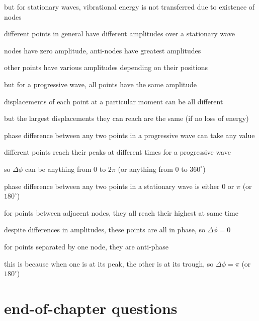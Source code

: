 but for stationary waves, vibrational energy is not transferred due to existence of nodes

\cmt different points in general have different amplitudes over a stationary wave

\hspace*{1.25em} nodes have zero amplitude, anti-nodes have greatest amplitudes

\hspace*{1.25em} other points have various amplitudes depending on their positions

but for a progressive wave, all points have the same amplitude

\hspace*{1.25em} displacements of each point at a particular moment can be all different

\hspace*{1.25em} but the largest displacements they can reach are the same (if no loss of energy)

\cmt phase difference between any two points in a progressive wave can take any value

\hspace*{1.25em} different points reach their peaks at different times for a progressive wave

\hspace*{1.25em} so $\Delta \phi$ can be anything from 0 to $2\pi$ (or anything from 0 to $360^\circ$)

phase difference between any two points in a stationary wave is either 0 or $\pi$ (or $180^\circ$)

\hspace*{1.25em} for points between adjacent nodes, they all reach their highest at same time

\hspace*{1.25em} despite differences in amplitudes, these points are all in phase, so $\Delta \phi=0$

\hspace*{1.25em} for points separated by one node, they are anti-phase

\hspace*{1.25em} this is because when one is at its peak, the other is at its trough, so $\Delta \phi = \pi$ (or $180^\circ$)


	
\section{end-of-chapter questions}


